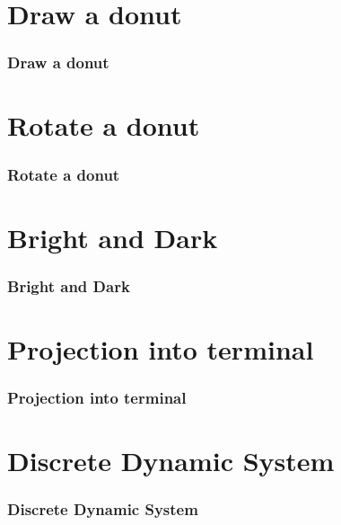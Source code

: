 \documentclass[12pt, t]{beamer}
\begin{document}

\section{Draw a donut}
\begin{frame}
    \frametitle{Draw a donut}

\end{frame}


\section{Rotate a donut}
\begin{frame}
    \frametitle{Rotate a donut}

\end{frame}


\section{Bright and Dark}
\begin{frame}
    \frametitle{Bright and Dark}

\end{frame}


\section{Projection into terminal}
\begin{frame}
    \frametitle{Projection into terminal}

\end{frame}


\section{Discrete Dynamic System}
\begin{frame}
    \frametitle{Discrete Dynamic System}

\end{frame}
\end{document}
